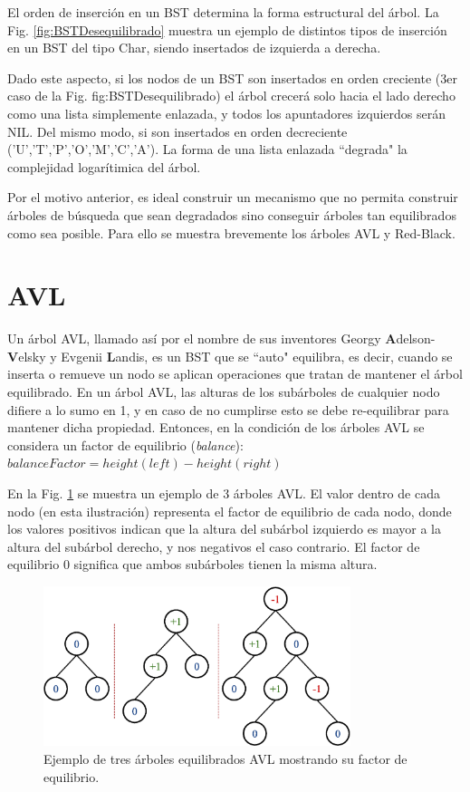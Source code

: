 El orden de inserción en un BST determina la forma estructural del árbol. La Fig. \ref{fig:BSTDesequilibrado} muestra un ejemplo de distintos tipos de inserción en un BST del tipo Char, siendo insertados de izquierda a derecha.

Dado este aspecto, si los nodos de un BST son insertados en orden creciente (3er caso de la Fig. {fig:BSTDesequilibrado}) el árbol crecerá solo hacia el lado derecho como una lista simplemente enlazada, y todos los apuntadores izquierdos serán NIL. Del mismo modo, si son insertados en orden decreciente ('U','T','P','O','M','C','A'). La forma de una lista enlazada ``degrada" la complejidad logarítimica del árbol.

Por el motivo anterior, es ideal construir un mecanismo que no permita construir árboles de búsqueda que sean degradados sino conseguir árboles tan equilibrados como sea posible. Para ello se muestra brevemente los árboles AVL y Red-Black.

\section{AVL}

Un árbol AVL, llamado así por el nombre de sus inventores Georgy \textbf{A}delson-\textbf{V}elsky y Evgenii \textbf{L}andis, es un BST que se ``auto" equilibra, es decir, cuando se inserta o remueve un nodo se aplican operaciones que tratan de mantener el árbol equilibrado. En un árbol AVL, las alturas de los subárboles de cualquier nodo difiere a lo sumo en 1, y en caso de no cumplirse esto se debe re-equilibrar para mantener dicha propiedad. Entonces, en la condición de los árboles AVL se considera un factor de equilibrio (\textit{balance}):
$balanceFactor = height(left) - height(right)$

En la Fig. \ref{fig:AVLExample1} se muestra un ejemplo de 3 árboles AVL. El valor dentro de cada nodo (en esta ilustración) representa el factor de equilibrio de cada nodo, donde los valores positivos indican que la altura del subárbol izquierdo es mayor a la altura del subárbol derecho, y nos negativos el caso contrario. El factor de equilibrio 0 significa que ambos subárboles tienen la misma altura. 

\begin{figure}[htpb!]
  \begin{center}
    \includegraphics[width=0.8\textwidth]{images/AVLExample1.eps}
  \end{center}
  \caption{Ejemplo de tres árboles equilibrados AVL mostrando su factor de equilibrio.}
  \label{fig:AVLExample1}
\end{figure}

